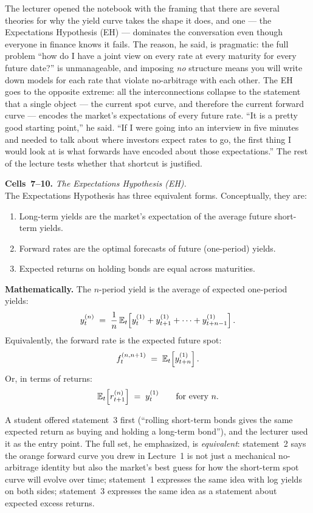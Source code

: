 The lecturer opened the notebook with the framing that there are several
theories for why the yield curve takes the shape it does, and one --- the
Expectations Hypothesis (EH) --- dominates the conversation even though
everyone in finance knows it fails. The reason, he said, is pragmatic: the
full problem ``how do I have a joint view on every rate at every maturity for
every future date?'' is unmanageable, and imposing \emph{no} structure means
you will write down models for each rate that violate no-arbitrage with each
other. The EH goes to the opposite extreme: all the interconnections collapse
to the statement that a single object --- the current spot curve, and
therefore the current forward curve --- encodes the market's expectations of
every future rate. ``It is a pretty good starting point,'' he said. ``If I
were going into an interview in five minutes and needed to talk about where
investors expect rates to go, the first thing I would look at is what
forwards have encoded about those expectations.'' The rest of the lecture
tests whether that shortcut is justified.

\begin{keyblock}
\textbf{Cells~7--10.} \emph{The Expectations Hypothesis (EH).}\\
The Expectations Hypothesis has three equivalent forms. Conceptually, they are:
\begin{enumerate}
  \item Long-term yields are the market's expectation of the average future
        short-term yields.
  \item Forward rates are the optimal forecasts of future (one-period)
        yields.
  \item Expected returns on holding bonds are equal across maturities.
\end{enumerate}
\textbf{Mathematically.} The $n$-period yield is the average of expected
one-period yields:
\[
  y^{(n)}_t \;=\; \frac{1}{n}\,\mathbb{E}_t\!\left[
     y^{(1)}_t + y^{(1)}_{t+1} + \cdots + y^{(1)}_{t+n-1}
  \right].
\]
Equivalently, the forward rate is the expected future spot:
\[
   f_t^{(n,n+1)} \;=\; \mathbb{E}_t\!\left[y^{(1)}_{t+n}\right].
\]
Or, in terms of returns:
\[
   \mathbb{E}_t\!\left[r^{(n)}_{t+1}\right] \;=\; y^{(1)}_t \qquad \text{for every $n$.}
\]
\end{keyblock}

A student offered statement~3 first (``rolling short-term bonds gives the same
expected return as buying and holding a long-term bond''), and the lecturer
used it as the entry point. The full set, he emphasized, is
\emph{equivalent}: statement~2 says the orange forward curve you drew in
Lecture~1 is not just a mechanical no-arbitrage identity but also the market's
best guess for how the short-term spot curve will evolve over time; statement~1
expresses the same idea with log yields on both sides; statement~3 expresses
the same idea as a statement about expected excess returns.

